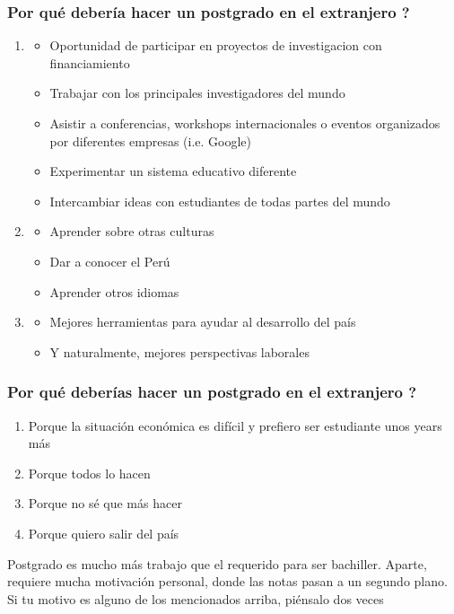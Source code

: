 \documentclass[10pt]{beamer}
\begin{document}
\begin{frame}
\frametitle{Por qué debería hacer un postgrado en el extranjero ?}
\begin{enumerate}
\item{ {\color{blue}{Aspecto Académico}}
   \begin{itemize}
   \item{Oportunidad de participar en proyectos de investigacion con financiamiento}
   \item{Trabajar con los principales investigadores del mundo}
   \item{Asistir a conferencias, workshops internacionales o eventos organizados por diferentes empresas (i.e. Google)}
   \item{Experimentar un sistema educativo diferente}
   \item{Intercambiar ideas con estudiantes de todas partes del mundo}
   \end{itemize}
}
\item{ {\color{blue}{Aspecto Cultural}}
    \begin{itemize}
	\item{ Aprender sobre otras culturas}
	\item{ Dar a conocer el Perú}
	\item{ Aprender otros idiomas}
	\end{itemize}
}	
\item{ {\color{blue}{Oportunidades a Futuro}}
	\begin{itemize}
	\item{Mejores herramientas para ayudar al desarrollo del país}
	\item{Y naturalmente, mejores perspectivas laborales}
	\end{itemize}
}	
\end{enumerate}

\end{frame}

\begin{frame}
\frametitle{Por qué {\color{magenta}{NO}} deberías hacer un postgrado en el extranjero ?}
\begin{enumerate}
\item{Porque la situación económica es difícil y prefiero ser estudiante unos years más}
\item{Porque todos lo hacen}
\item{Porque no sé que más hacer}
\item{Porque quiero salir del país}
\end{enumerate}

{\color{magenta}{Punchline:}} Postgrado es mucho más trabajo que el requerido para ser bachiller. Aparte, requiere mucha motivación personal, donde las notas pasan a un segundo plano. Si tu motivo es alguno de los mencionados arriba, piénsalo dos veces
\end{frame}
\end{document}
